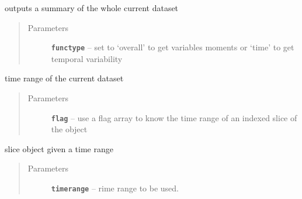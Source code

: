 \documentclass[letterpaper,10pt,english]{sphinxmanual}
\begin{document}
\begin{fulllineitems}
\begin{fulllineitems}
\label{altimetry.data:altimetry.data.hydro_data.summary}
outputs a summary of the whole current dataset
\begin{quote}\begin{description}
\item[{Parameters}] \leavevmode
\textbf{\texttt{functype}} -- set to `overall' to get variables moments or `time' to get temporal variability

\end{description}\end{quote}

\end{fulllineitems}


\begin{fulllineitems}
\label{altimetry.data:altimetry.data.hydro_data.time_range}
time range of the current dataset
\begin{quote}\begin{description}
\item[{Parameters}] \leavevmode
\textbf{\texttt{flag}} -- use a flag array to know the time range of an indexed slice of the object

\end{description}\end{quote}

\end{fulllineitems}


\begin{fulllineitems}
\label{altimetry.data:altimetry.data.hydro_data.time_slice}
slice object given a time range
\begin{quote}\begin{description}
\item[{Parameters}] \leavevmode
\textbf{\texttt{timerange}} -- rime range to be used.

\end{description}\end{quote}


\end{fulllineitems}
\end{fulllineitems}
\end{document}
